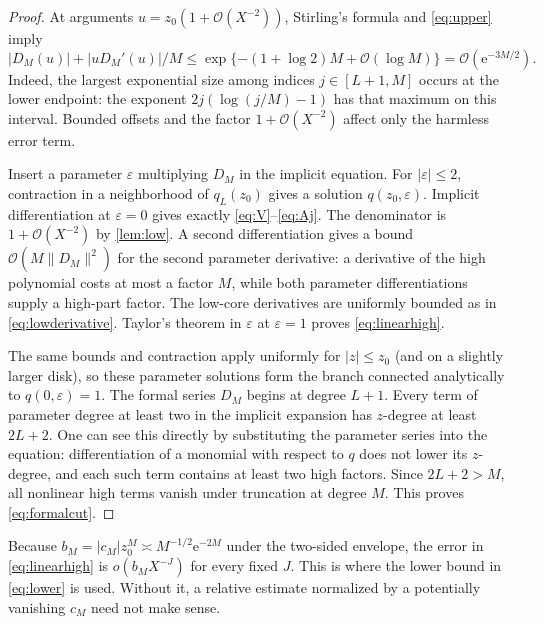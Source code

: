 \documentclass[11pt,a4paper]{article}
\theoremstyle{definition}
\numberwithin{equation}{section}
\newcommand{\e}{\mathrm e}
\newcommand{\Oh}{\mathcal O}
\begin{document}
\begin{proof}
At arguments $u=z_0(1+\Oh(X^{-2}))$, Stirling's formula and \eqref{eq:upper} imply
\[
 |D_M(u)|+|uD_M'(u)|/M
 \le \exp\{-(1+\log2)M+\Oh(\log M)\}
 =\Oh(\e^{-3M/2}).
\]
Indeed, the largest exponential size among indices $j\in[L+1,M]$ occurs at the lower endpoint: the exponent $2j(\log(j/M)-1)$ has that maximum on this interval. Bounded offsets and the factor $1+\Oh(X^{-2})$ affect only the harmless error term.

Insert a parameter $\varepsilon$ multiplying $D_M$ in the implicit equation. For $|\varepsilon|\le2$, contraction in a neighborhood of $q_L(z_0)$ gives a solution $q(z_0,\varepsilon)$. Implicit differentiation at $\varepsilon=0$ gives exactly \eqref{eq:V}--\eqref{eq:Aj}. The denominator is $1+\Oh(X^{-2})$ by \cref{lem:low}. A second differentiation gives a bound $\Oh(M\|D_M\|^2)$ for the second parameter derivative: a derivative of the high polynomial costs at most a factor $M$, while both parameter differentiations supply a high-part factor. The low-core derivatives are uniformly bounded as in \eqref{eq:lowderivative}. Taylor's theorem in $\varepsilon$ at $\varepsilon=1$ proves \eqref{eq:linearhigh}.

The same bounds and contraction apply uniformly for $|z|\le z_0$ (and on a slightly larger disk), so these parameter solutions form the branch connected analytically to $q(0,\varepsilon)=1$. The formal series $D_M$ begins at degree $L+1$. Every term of parameter degree at least two in the implicit expansion has $z$-degree at least $2L+2$. One can see this directly by substituting the parameter series into the equation: differentiation of a monomial with respect to $q$ does not lower its $z$-degree, and each such term contains at least two high factors. Since $2L+2>M$, all nonlinear high terms vanish under truncation at degree $M$. This proves \eqref{eq:formalcut}.
\end{proof}

Because $b_M=|c_M|z_0^M\asymp M^{-1/2}\e^{-2M}$ under the two-sided envelope, the error in \eqref{eq:linearhigh} is $o(b_MX^{-J})$ for every fixed $J$. This is where the lower bound in \eqref{eq:lower} is used. Without it, a relative estimate normalized by a potentially vanishing $c_M$ need not make sense.
\end{document}
